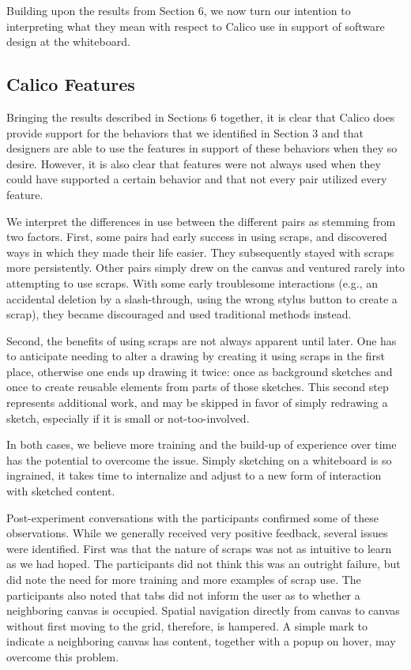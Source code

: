 Building upon the results from Section 6, we now turn our intention to interpreting what they mean with respect to Calico use in support of software design at the whiteboard.

\subsection {Calico Features}
\label{discussion:1}

Bringing the results described in Sections 6 together, it is clear that Calico does provide support for the behaviors that we identified in Section 3 and that designers are able to use the features in support of these behaviors when they so desire. However, it is also clear that features were not always used when they could have supported a certain behavior and that not every pair utilized every feature.

We interpret the differences in use between the different pairs as stemming from two factors. First, some pairs had early success in using scraps, and discovered ways in which they made their life easier. They subsequently stayed with scraps more persistently. Other pairs simply drew on the canvas and ventured rarely into attempting to use scraps. With some early troublesome interactions (e.g., an accidental deletion by a slash-through, using the wrong stylus button to create a scrap), they became discouraged and used traditional methods instead. 

Second, the benefits of using scraps are not always apparent until later. One has to anticipate needing to alter a drawing by creating it using scraps in the first place, otherwise one ends up drawing it twice: once as background sketches and once to create reusable elements from parts of those sketches. This second step represents additional work, and may be skipped in favor of simply redrawing a sketch, especially if it is small or not-too-involved. 

In both cases, we believe more training and the build-up of experience over time has the potential to overcome the issue. Simply sketching on a whiteboard is so ingrained, it takes time to internalize and adjust to a new form of interaction with sketched content. 

Post-experiment conversations with the participants confirmed some of these observations. While we generally received very positive feedback, several issues were identified. First was that the nature of scraps was not as intuitive to learn as we had hoped. The participants did not think this was an outright failure, but did note the need for more training and more examples of scrap use. The participants also noted that tabs did not inform the user as to whether a neighboring canvas is occupied. Spatial navigation directly from canvas to canvas without first moving to the grid, therefore, is hampered. A simple mark to indicate a neighboring canvas has content, together with a popup on hover, may overcome this problem. 

